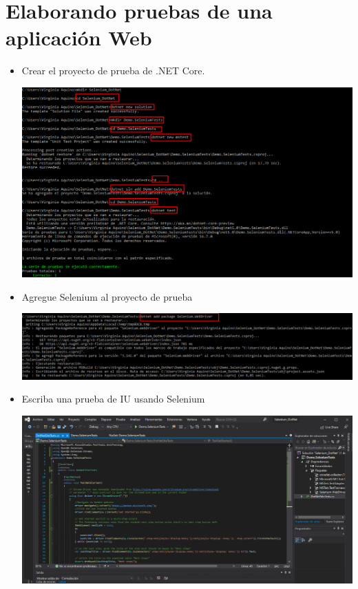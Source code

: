 \section{Elaborando pruebas de una aplicación Web} 
\begin{itemize}
 \item  Crear el proyecto de prueba de .NET Core.
\begin{center}
\includegraphics[width=\columnwidth]{images/1}\newline
\end{center}
\item Agregue Selenium al proyecto de prueba 
\begin{center}
\includegraphics[width=\columnwidth]{images/2}\newline
\end{center}
\item Escriba una prueba de IU usando Selenium
\begin{center}
\includegraphics[width=\columnwidth]{images/3}\newline

\end{center}
\end{itemize}
